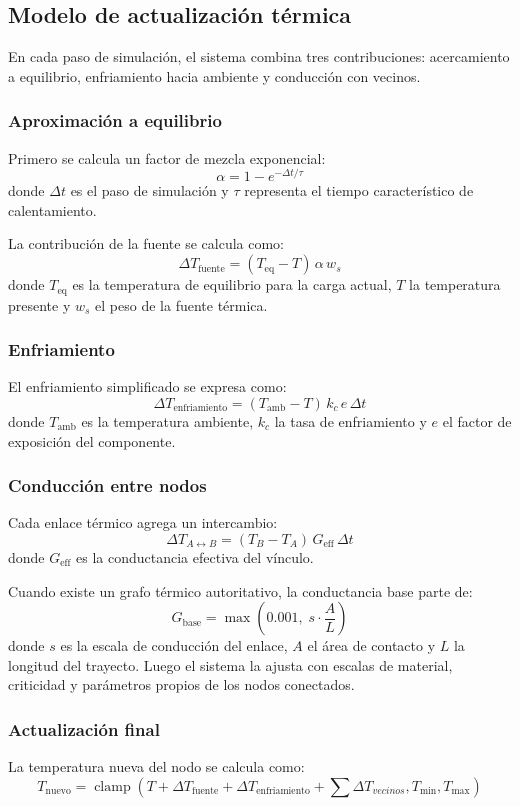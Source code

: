 \documentclass[12pt,letterpaper]{article}
\begin{document}
\subsection{Modelo de actualización térmica}
En cada paso de simulación, el sistema combina tres contribuciones: acercamiento a equilibrio, enfriamiento hacia ambiente y conducción con vecinos.

\subsubsection{Aproximación a equilibrio}
Primero se calcula un factor de mezcla exponencial:
\[
\alpha = 1 - e^{-\Delta t / \tau}
\]
donde $\Delta t$ es el paso de simulación y $\tau$ representa el tiempo característico de calentamiento.

La contribución de la fuente se calcula como:
\[
\Delta T_{\text{fuente}} = (T_{\text{eq}} - T)\,\alpha\,w_s
\]
donde $T_{\text{eq}}$ es la temperatura de equilibrio para la carga actual, $T$ la temperatura presente y $w_s$ el peso de la fuente térmica.

\subsubsection{Enfriamiento}
El enfriamiento simplificado se expresa como:
\[
\Delta T_{\text{enfriamiento}} = (T_{\text{amb}} - T)\,k_c\,e\,\Delta t
\]
donde $T_{\text{amb}}$ es la temperatura ambiente, $k_c$ la tasa de enfriamiento y $e$ el factor de exposición del componente.

\subsubsection{Conducción entre nodos}
Cada enlace térmico agrega un intercambio:
\[
\Delta T_{A \leftrightarrow B} = (T_B - T_A)\,G_{\text{eff}}\,\Delta t
\]
donde $G_{\text{eff}}$ es la conductancia efectiva del vínculo.

Cuando existe un grafo térmico autoritativo, la conductancia base parte de:
\[
G_{\text{base}} = \max\left(0.001,\; s \cdot \frac{A}{L}\right)
\]
donde $s$ es la escala de conducción del enlace, $A$ el área de contacto y $L$ la longitud del trayecto. Luego el sistema la ajusta con escalas de material, criticidad y parámetros propios de los nodos conectados.

\subsubsection{Actualización final}
La temperatura nueva del nodo se calcula como:
\[
T_{\text{nuevo}} =
\operatorname{clamp}
\left(
T + \Delta T_{\text{fuente}} + \Delta T_{\text{enfriamiento}} + \sum \Delta T_{vecinos},
T_{\min},
T_{\max}
\right)
\]
\end{document}
